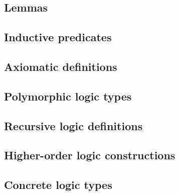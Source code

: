 
\subsection{Lemmas}
\absent


\subsection{Inductive predicates}
\absent


\subsection{Axiomatic definitions}
\absent


\subsection{Polymorphic logic types}
\absent


\subsection{Recursive logic definitions}
\nodiff


\subsection{Higher-order logic constructions}
\absent


\subsection{Concrete logic types}
\absent


